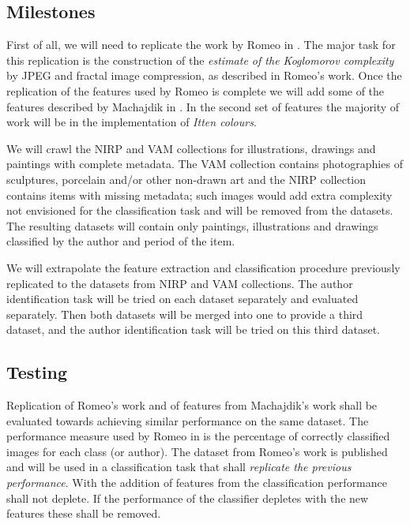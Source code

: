 \documentclass[a4paper]{article}
\begin{document}
\subsection{Milestones}

First of all, we will need to replicate the work by Romeo in \cite{rmc12ajs}.
The major task for this replication is the construction of the \emph{estimate
of the Koglomorov complexity} by JPEG and fractal image compression, as
described in Romeo's work. Once the replication of the features used by Romeo
is complete we will add some of the features described by Machajdik in
\cite{mach10clas}.  In the second set of features the majority of work will be
in the implementation of \emph{Itten colours}.

We will crawl the NIRP and VAM collections for illustrations, drawings and
paintings with complete metadata.  The VAM collection contains photographies of
sculptures, porcelain and/or other non-drawn art and the NIRP collection
contains items with missing metadata; such images would add extra complexity
not envisioned for the classification task and will be removed from the
datasets.  The resulting datasets will contain only paintings, illustrations
and drawings classified by the author and period of the item.

We will extrapolate the feature extraction and classification procedure
previously replicated to the datasets from NIRP and VAM collections.  The
author identification task will be tried on each dataset separately and
evaluated separately.  Then both datasets will be merged into one to provide a
third dataset, and the author identification task will be tried on this third
dataset.


\subsection{Testing}

Replication of Romeo's work and of features from Machajdik's work shall be
evaluated towards achieving similar performance on the same dataset.  The
performance measure used by Romeo in \cite{rmc12ajs} is the percentage of
correctly classified images for each class (or author).  The dataset from
Romeo's work is published and will be used in a classification task that shall
\emph{replicate the previous performance}.  With the addition of features from
\cite{mach10clas} the classification performance shall not deplete.  If the
performance of the classifier depletes with the new features these shall be
removed.
\end{document}
